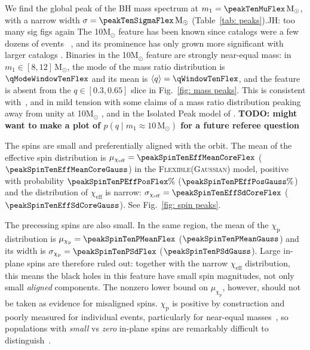\documentclass[%
 reprint,
 amsmath,amssymb,
 aps,
 prl,
 nofootinbib,nobibnotes,
]{revtex4-2}
\newcommand{\Msun}{\ensuremath{\mathrm{M}_{\odot}}}
\newcommand{\chieff}{\ensuremath{\chi_{\mathrm{eff}}}}
\newcommand{\chip}{\ensuremath{\chi_{\mathrm{p}}}}
\newcommand{\todo}[1]{{\color{Blue}\bf TODO: #1}}
\newcommand{\jh}[1]{{\color{orange}JH: #1}}
\newcommand{\flexiblespins}{\textsc{Flexible}\xspace}
\newcommand{\gaussianspins}{\textsc{Gaussian}\xspace}
\newcommand{\featTen}{10\xspace}
\begin{document}
We find the global peak of the \ac{BH} mass spectrum at $m_1 = \peakTenMuFlex\,\Msun$, with a narrow width $\sigma = \peakTenSigmaFlex\,\Msun$ (Table~\ref{tab: peaks}).\jh{too many sig figs again} The \featTen $\Msun$ feature has been known since catalogs were a few dozens of events ~\cite[e.g.,][]{LIGOScientific:2020kqk, Talbot:2018cva, Tiwari:2020otp, Edelman:2021zkw, KAGRA:2021duu, Callister:2023tgi}, and its prominence has only grown more significant with larger catalogs \cite{LIGOScientific:2025pvj, LIGOScientific:2026ctl}. %
Binaries in the \featTen $\Msun$ feature are strongly near-equal mass: in $m_1 \in [8, 12]\,\Msun$, the mode of the mass ratio distribution is $\qModeWindowTenFlex$ and its mean is $\langle q \rangle = \qWindowTenFlex$, and the feature is absent from the $q \in [0.3, 0.65]$ slice in Fig.~\ref{fig: mass peaks}. This is consistent with~\cite{Farah:2023swu, LIGOScientific:2026ctl, Flanagan:2026ayy}, and in mild tension with some claims of a mass ratio distribution peaking away from unity at \featTen $\Msun$ \cite{Godfrey:2023oxb, Sadiq:2023zee, Sridhar:2025kvi}, and in the Isolated Peak model of \citet{LIGOScientific:2025pvj}. \todo{might want to make a plot of $p(q \mid m_1 \approx 10\,\Msun)$ for a future referee question}

The spins are small and preferentially aligned with the orbit. The mean of the effective spin distribution is $\mu_{\chieff} = \peakSpinTenEffMeanCoreFlex$ ($\peakSpinTenEffMeanCoreGauss$) in the \flexiblespins (\gaussianspins) model, positive with probability $\peakSpinTenPEffPosFlex\%$ ($\peakSpinTenPEffPosGauss\%$) and the distribution of $\chieff$ is narrow: $\sigma_{\chieff} = \peakSpinTenEffSdCoreFlex$ ($\peakSpinTenEffSdCoreGauss$). See Fig.~\ref{fig: spin peaks}.

The precessing spins are also small. In the same region, the mean of the $\chip$ distribution is $\mu_{\chip} = \peakSpinTenPMeanFlex$ ($\peakSpinTenPMeanGauss$) and its width is $\sigma_{\chip} = \peakSpinTenPSdFlex$ ($\peakSpinTenPSdGauss$). Large in-plane spins are therefore ruled out: together with the narrow $\chieff$ distribution, this means the black holes in this feature have small spin magnitudes, not only small \textit{aligned} components. The nonzero lower bound on $\mu_{\chip}$, however, should not be taken as evidence for misaligned spins. $\chip$ is positive by construction and poorly measured for individual events, particularly for near-equal masses~\cite{Apostolatos:1994mx, Green:2020ptm}, so populations with \textit{small} vs \textit{zero} in-plane spins are remarkably difficult to distinguish~\cite[e.g.]{Vitale:2022dpa, Miller:2024sui, Vitale:2025lms}. 
\end{document}
